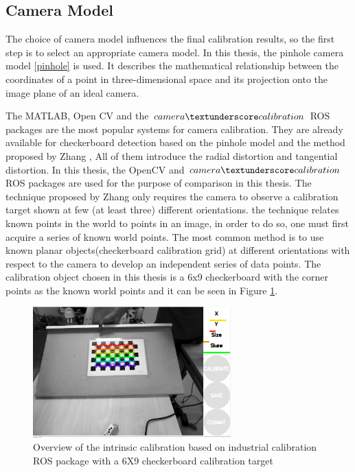 \subsection{Camera Model} \label{intrinsic}

The choice of camera model influences the final calibration results, so the first step is to select an appropriate camera model. In this thesis, the pinhole camera model \ref{pinhole} is used. It describes the mathematical relationship between the coordinates of a point in three-dimensional space and its projection onto the image plane of an ideal camera. 

The MATLAB, Open CV  and the $camera\textunderscore calibration$ ROS  \cite{calRos} packages are the most popular systems for camera calibration. They are already available for checkerboard detection based on the pinhole model and the method proposed by Zhang \cite{Zhang}, All of them introduce the radial distortion and tangential distortion. In this thesis, the OpenCV and $camera\textunderscore calibration$ ROS packages are used for the purpose of comparison in this thesis.
The technique proposed by Zhang only requires the camera to observe a calibration target shown at few (at least three) different orientations. the technique relates known points in the world to points in an image, in order to do so, one must first acquire a series of known world points. The most common method is to use known planar objects(checkerboard calibration grid) at different orientations with respect to the camera to develop an independent series of data points. The calibration object chosen in this thesis is a 6x9 checkerboard with the corner points as the known world points and it can be seen in Figure \ref{fig:target0}.

\begin{figure}[!h]
\begin{center}
\includegraphics[width=3in]{figures03/intros.png}
\caption{Overview of the intrinsic calibration based on industrial calibration ROS package with a 6X9 checkerboard calibration target}%
\label{fig:target0}
\end{center}
\end{figure}

